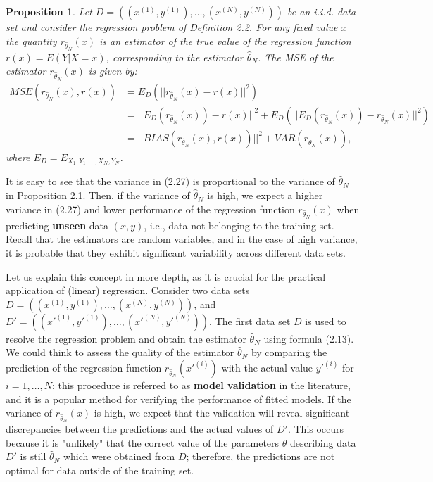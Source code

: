 \documentclass{report}
\newtheorem{proposition}{Proposition}[chapter]
\begin{document}
\begin{proposition}
Let $D = ((x^{(1)},y^{(1)}),\dots,(x^{(N)},y^{(N)}))$ be an i.i.d. data set and consider the regression problem of Definition 2.2. For any fixed value $x$ the quantity $r_{\hat{\theta}_N}(x)$ is an estimator of the true value of the regression function $r(x) = E(Y|X = x)$, corresponding to the estimator $\hat{\theta}_N$. The MSE of the estimator $r_{\hat{\theta}_N}(x)$ is given by:
\begin{equation}
\begin{split}
MSE(r_{\hat{\theta}_N}(x),r(x)) &= E_D(||r_{\hat{\theta}_N}(x) - r(x)||^2) \\
&=||E_D(r_{\hat{\theta}_N}(x)) - r(x)||^2+E_D(||E_D(r_{\hat{\theta}_N}(x)) - r_{\hat{\theta}_N}(x)||^2)\\
&=||BIAS(r_{\hat{\theta}_N}(x), r(x))||^2 + VAR(r_{\hat{\theta}_N}(x)),
\end{split}
\end{equation}
where $E_D = E_{X_1,Y_1,\dots,X_N,Y_N}$.
\end{proposition}
It is easy to see that the variance in (2.27) is proportional to the variance of $\hat{\theta}_N$ in Proposition 2.1. Then, if the variance of $\hat{\theta}_N$ is high, we expect a higher variance in (2.27) and lower performance of the regression function $r_{\hat{\theta}_N}(x)$ when predicting \textbf{unseen} data $(x,y)$, i.e., data not belonging to the training set. Recall that the estimators are random variables, and in the case of high variance, it is probable that they exhibit significant variability across different data sets.

Let us explain this concept in more depth, as it is crucial for the practical application of (linear) regression. Consider two data sets $D = ((x^{(1)},y^{(1)}),\dots,(x^{(N)},y^{(N)}))$, and $D' = ((x'^{(1)},y'^{(1)}),\dots,(x'^{(N)},y'^{(N)}))$. The first data set $D$ is used to resolve the regression problem and obtain the estimator $\hat{\theta}_N$ using formula (2.13). We could think to assess the quality of the estimator $\hat{\theta}_N$ by comparing the prediction of the regression function $r_{\hat{\theta}_N}(x'^{(i)})$ with the actual value $y'^{(i)}$ for $i = 1,\dots,N$; this procedure is referred to as \textbf{model validation} in the literature, and it is a popular method for verifying the performance of fitted models. If the variance of $r_{\hat{\theta}_N}(x)$ is high, we expect that the validation will reveal significant discrepancies between the predictions and the actual values of $D'$. This occurs because it is "unlikely" that the correct value of the parameters $\theta$ describing data $D'$ is still $\hat{\theta}_N$ which were obtained from $D$; therefore, the predictions are not optimal for data outside of the training set.
\end{document}
